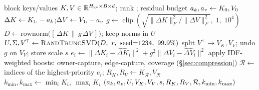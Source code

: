 \begin{\tabenv}[t]
  \centering
  \caption{Per-$256$-token-block storage, computed from the model dimensions and the store's fp16
  layout. The low-rank core is fixed; the residual budget \maxres{} sets the ratio.}
  \label{tab:budget}
  \small
  
\end{\tabenv}

\begin{\algenv}[t]
\caption{Compress one block (streaming, batched across layers in the implementation)}
\label{alg:compress}
\begin{algorithmic}[1]
\Require block keys/values $K,V\in\mathbb{R}^{H_{\mathrm{kv}}\times B\times d}$; rank \rank{}; residual budget \maxres{}
\State $a_k,a_v \gets K_0, V_0$ 
\State $\Delta K \gets K_{1:}-a_k$;\quad $\Delta V \gets V_{1:}-a_v$
\State $g \gets \operatorname{clip}\!\left(\sqrt{\lVert\Delta K\rVert_F^2 / \lVert\Delta V\rVert_F^2},\;1,\;10^4\right)$ 
\State $D \gets \text{rownorm}\big([\,\Delta K \,\|\, g\,\Delta V\,]\big)$; keep norms in $U$
\State $U, \Sigma, V^{\!\top} \gets \textsc{RandTruncSVD}(D,\ r,\ \text{seed}{=}1234,\ 99.9\%)$
\State split $V^{\!\top}\!\to V_K, V_V$; undo $g$ on $V_V$; store scale $s$
\State $e_i \gets \lVert\Delta K_i - \widehat{\Delta K}_i\rVert^2 + g^2\lVert\Delta V_i - \widehat{\Delta V}_i\rVert^2$ 
\State apply IDF-weighted boosts: owner-capture, edge-capture, coverage (\S\ref{sec:compression})
\State $\mathcal{R}\gets$ indices of the \maxres{} highest-priority $e_i$; $R_K,R_V \gets K_{\mathcal R}, V_{\mathcal R}$ 
\State $k_{\min},k_{\max}\gets \min_i K_i,\ \max_i K_i$ 
\State \Return $(a_k,a_v,U,V_K,V_V,s,R_K,R_V,\mathcal R,k_{\min},k_{\max})$
\end{algorithmic}
\end{\algenv}
